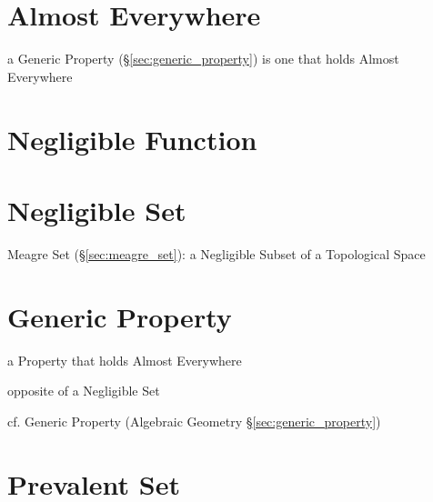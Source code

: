 \section{Almost Everywhere}\label{sec:almost_everywhere}

a Generic Property (\S\ref{sec:generic_property}) is one that holds Almost
Everywhere



\section{Negligible Function}\label{sec:negligible_function}

\section{Negligible Set}\label{sec:negligible_set}

Meagre Set (\S\ref{sec:meagre_set}): a Negligible Subset of a Topological Space



\section{Generic Property}\label{sec:generic_measure_property}

a Property that holds Almost Everywhere

opposite of a Negligible Set

cf. Generic Property (Algebraic Geometry \S\ref{sec:generic_property})



\section{Prevalent Set}\label{sec:prevalent_set}

